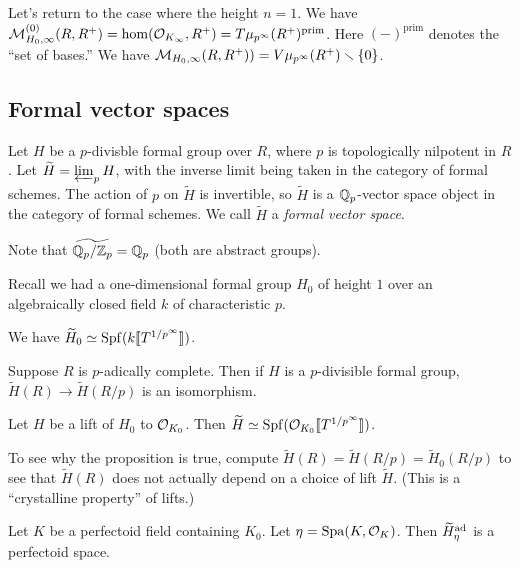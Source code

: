 Let's return to the case where the height $n=1$. We have 
$\mathcal{M}_{H_0,\infty}^{(0)}(R,R^+) = \hom(\mathcal{O}_{K_\infty}, R^+) = T \mu_{p^\infty}(R^+)^\text{prim}$. Here $(-)^\text{prim}$ denotes the ``set of bases.'' 
We have $\mathcal{M}_{H_0,\infty}(R,R^+)) = V \mu_{p^\infty}(R^+)\smallsetminus \{0\}$. 





\subsection{Formal vector spaces}

Let $H$ be a $p$-divisble formal group over $R$, where $p$ is topologically 
nilpotent in $R$. Let $\widetilde H=\varprojlim_p H$, with the inverse 
limit being taken in the category of formal schemes. The action of $p$ on 
$\widetilde H$ is invertible, so $\widetilde H$ is a $\mathbb{Q}_p$-vector space 
object in the category of formal schemes. We call $\widetilde H$ a 
\emph{formal vector space}. 

Note that $\widetilde{\mathbb{Q}_p/\mathbb{Z}_p} = \mathbb{Q}_p$ (both are abstract groups). 

Recall we had a one-dimensional formal group $H_0$ of height $1$ over an 
algebraically closed field $k$ of characteristic $p$. 

\begin{proposition}
We have $\widetilde H_0\simeq \operatorname{Spf}(k\llbracket {T^{1/p^\infty}} \rrbracket)$. 
\end{proposition}

\begin{proposition}
Suppose $R$ is $p$-adically complete. Then if $H$ is a $p$-divisible formal 
group, $\widetilde H(R)\to \widetilde H(R/p)$ is an isomorphism. 
\end{proposition}

\begin{proposition}
Let $H$ be a lift of $H_0$ to $\mathcal{O}_{K_0}$. Then 
$\widetilde H\simeq \operatorname{Spf}(\mathcal{O}_{K_0}\llbracket {T^{1/p^\infty}} \rrbracket)$. 
\end{proposition}

To see why the proposition is true, compute 
$\widetilde H(R) = \widetilde H(R/p) = \widetilde H_0(R/p)$ to see that 
$\widetilde H(R)$ does not actually depend on a choice of lift $\widetilde H$. (This 
is a ``crystalline property'' of lifts.)


\begin{corollary}
Let $K$ be a perfectoid field containing $K_0$. Let $\eta=\operatorname{Spa}(K,\mathcal{O}_K)$. Then 
$\widetilde H_\eta^{\textnormal{ad}}$ is a perfectoid space. 
\end{corollary}

